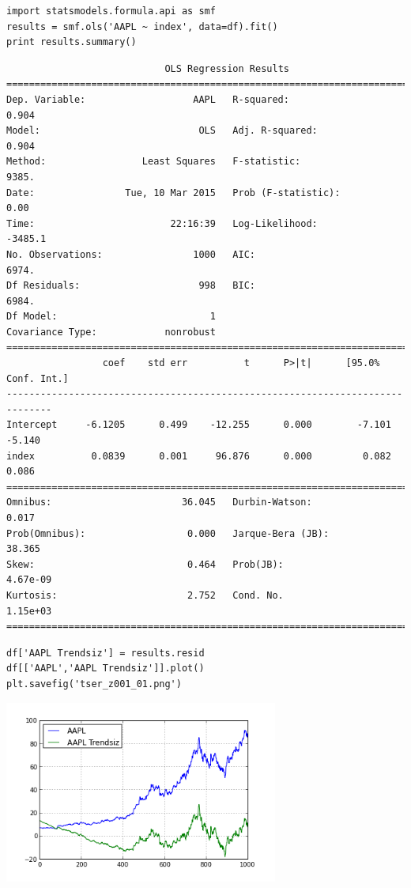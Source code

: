 \documentclass[12pt,fleqn]{article}\usepackage{../../common}
\begin{document}
\begin{verbatim}
import statsmodels.formula.api as smf
results = smf.ols('AAPL ~ index', data=df).fit()
print results.summary()
\end{verbatim}

\begin{verbatim}
                            OLS Regression Results                            
==============================================================================
Dep. Variable:                   AAPL   R-squared:                       0.904
Model:                            OLS   Adj. R-squared:                  0.904
Method:                 Least Squares   F-statistic:                     9385.
Date:                Tue, 10 Mar 2015   Prob (F-statistic):               0.00
Time:                        22:16:39   Log-Likelihood:                -3485.1
No. Observations:                1000   AIC:                             6974.
Df Residuals:                     998   BIC:                             6984.
Df Model:                           1                                         
Covariance Type:            nonrobust                                         
==============================================================================
                 coef    std err          t      P>|t|      [95.0% Conf. Int.]
------------------------------------------------------------------------------
Intercept     -6.1205      0.499    -12.255      0.000        -7.101    -5.140
index          0.0839      0.001     96.876      0.000         0.082     0.086
==============================================================================
Omnibus:                       36.045   Durbin-Watson:                   0.017
Prob(Omnibus):                  0.000   Jarque-Bera (JB):               38.365
Skew:                           0.464   Prob(JB):                     4.67e-09
Kurtosis:                       2.752   Cond. No.                     1.15e+03
==============================================================================
\end{verbatim}

\begin{verbatim}
df['AAPL Trendsiz'] = results.resid
df[['AAPL','AAPL Trendsiz']].plot()
plt.savefig('tser_z001_01.png')
\end{verbatim}

\includegraphics[height=6cm]{tser_z001_01.png}
\end{document}
